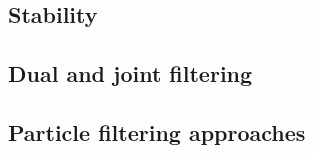 \subsection{Stability}
\parencite{Haykin2001}
\subsection{Dual and joint filtering}
\parencite{Haykin2001}
\subsection{Particle filtering approaches}
\parencite{Kantas2009,doucet2001sequential,Lindsten2010}